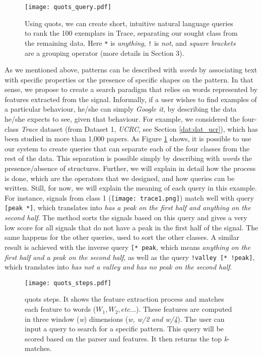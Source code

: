 \begin{figure}
    \centering
    \texttt{[image: quots\_query.pdf]}
    \caption{Using \gls{quots}, we can create short, intuitive natural language queries to rank the 100 exemplars in Trace, separating our sought class from the remaining data. Here \texttt{*} is \textit{anything}, \texttt{!} is \textit{not}, and \textit{square brackets} are a grouping operator (more details in Section 3).}
    \label{fig:query_cold_start}
\end{figure}

As we mentioned above, patterns can be described with \textit{words} by associating text with specific properties or the presence of specific shapes on the pattern. In that sense, we propose to create a search paradigm that relies on words represented by features extracted from the signal. Informally, if a user wishes to find examples of a particular behaviour, he/she can simply \textit{Google it}, by describing the data he/she expects to see, given that behaviour. For example, we considered the four-class \textit{Trace} dataset (from Dataset 1, \textit{UCRC}, see Section \ref{dat:dat_ucr}), which has been studied in more than 1,000 papers. As Figure \ref{fig:query_cold_start} shows, it is possible to use our system to create queries that can separate each of the four classes from the rest of the data. This separation is possible simply by describing with \textit{words} the presence/absence of structures. Further, we will explain in detail how the process is done, which are the operators that we designed, and how queries can be written. Still, for now, we will explain the meaning of each query in this example. For instance, signals from class 1 (\texttt{[image: trace1.png]}) match well with query \texttt{[peak *]}, which translates into \textit{has a peak on the first half and anything on the second half}. The method sorts the signals based on this query and gives a very low score for all signals that do not have a peak in the first half of the signal. The same happens for the other queries, used to sort the other classes. A similar result is achieved with the inverse query \texttt{[* peak}, which means \textit{anything on the first half and a peak on the second half}, as well as the query \texttt{!valley [* !peak]}, which translates into \textit{has not a valley and has no peak on the second half}.

\begin{figure}
\centering
\texttt{[image: quots\_steps.pdf]}
\caption{\gls{quots} steps. It shows the feature extraction process and matches each feature to words ($W_1, W_2, etc...$). These features are computed in three window (\textit{w}) dimensions (\textit{w, w/2 and w/4}). The user can input a query to search for a specific pattern. This query will be scored based on the parser and features. It then returns the top \textit{k}-matches.}
\label{fig:quots_steps}
\end{figure}

